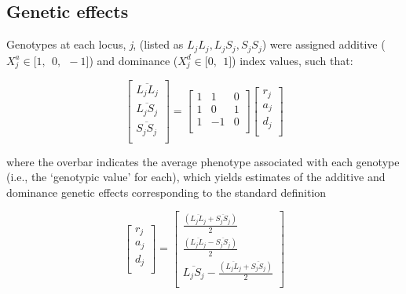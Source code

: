 \begin{refsection}
\subsection{Genetic effects}

Genotypes at each locus, \emph{j}, (listed as
\(L_{j}L_{j},L_{j}S_{j},S_{j}S_{j}\)) were assigned additive
(\(X_{j}^{a} \in \lbrack 1,\ \ 0,\ \  - 1\rbrack\)) and dominance
(\(X_{j}^{d} \in \lbrack 0,\ \ 1\rbrack\)) index values, such that:

\begin{equation}
\begin{bmatrix}
\overline{L_{j}L_{j}} \\
\overline{L_{j}S_{j}} \\
\overline{S_{j}S_{j}} \\
\end{bmatrix} = \begin{bmatrix}
1 & 1 & 0 \\
1 & 0 & 1 \\
1 & - 1 & 0 \\
\end{bmatrix}\begin{bmatrix}
r_{j} \\
a_{j} \\
d_{j} \\
\end{bmatrix}
\end{equation}

where the overbar indicates the average phenotype associated with each
genotype (i.e., the `genotypic value' for each), which yields estimates
of the additive and dominance genetic effects corresponding to the
standard definition \parencite{Falconer1996-ot}

\begin{equation}
\begin{bmatrix}
r_{j} \\
a_{j} \\
d_{j} \\
\end{bmatrix} = \begin{bmatrix}
\frac{\left( \overline{L_{j}L_{j}} + \overline{S_{j}S_{j}} \right)}{2} \\
\frac{\left( \overline{L_{j}L_{j}} - \overline{S_{j}S_{j}} \right)}{2} \\
\overline{L_{j}S_{j}} - \frac{\left( \overline{L_{j}L_{j}} + \overline{S_{j}S_{j}} \right)}{2} \\
\end{bmatrix}
\end{equation}


\end{refsection}
